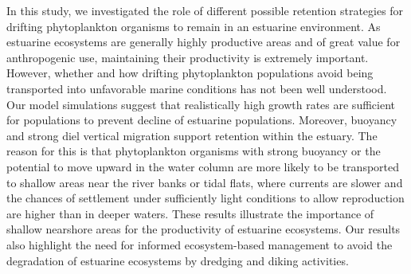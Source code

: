 \documentclass[npg, manuscript]{copernicus}
\begin{document}
\conclusions  %
In this study, we investigated the role of different possible retention strategies for drifting phytoplankton organisms to remain in an estuarine environment.
As estuarine ecosystems are generally highly productive areas and of great value for anthropogenic use, maintaining their productivity is extremely important. However, whether and how drifting phytoplankton populations avoid being transported into unfavorable marine conditions has not been well understood. 
Our model simulations suggest that realistically high growth rates are sufficient for populations to prevent decline of estuarine populations.
Moreover, buoyancy and strong diel vertical migration support retention within the estuary.
The reason for this is that phytoplankton organisms with strong buoyancy or the potential to move upward in the water column are more likely to be transported to shallow areas near the river banks or tidal flats, where currents are slower and the chances of settlement under sufficiently light conditions to allow reproduction are higher than in deeper waters.
These results illustrate the importance of shallow nearshore areas for the productivity of estuarine ecosystems.
Our results also highlight the need for informed ecosystem-based management to avoid the degradation of estuarine ecosystems by dredging and diking activities.













\end{document}
